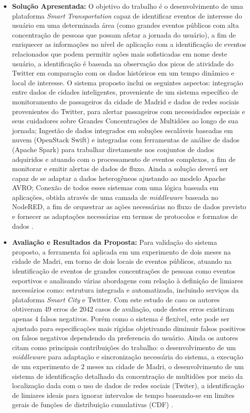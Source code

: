 \documentclass[tid,table]{texufpel} %
\begin{document}
\begin{itemize}
	\item \textbf{Solução Apresentada:} O objetivo do trabalho é o desenvolvimento de uma plataforma \textit{Smart Transportation} capaz de identificar eventos de interesse do usuário em uma determinada área (como grandes eventos públicos com alta concentração de pessoas que possam afetar a jornada do usuário), a fim de enriquecer as informações no nível de aplicação com a identificação de eventos relacionados que podem permitir ações mais sofisticadas em nome deste usuário, a identificação é baseada na observação dos picos de atividade do Twitter em comparação com os dados históricos em um tempo dinâmico e local de interesse. O sistema proposto inclui os seguintes aspectos: integração entre dados de cidades inteligentes, proveniente de um sistema específico de monitoramento de passageiros da cidade de Madrid e dados de redes sociais provenientes do Twitter, para alertar passageiros com necessidades especiais e seus cuidadores sobre Grandes Concentrações de Multidões ao longo de sua jornada; Ingestão de dados integrados em soluções escaláveis baseadas em nuvem (OpenStack Swift) e integradas com ferramentas de análise de dados (Apache Spark) para trabalhar diretamente nos conjuntos de dados adquiridos e atuando com o processamento de eventos complexos, a fim de monitorar e emitir alertas de dados de fluxo. Ainda a solução deverá ser capaz de se adaptar a dados heterogêneos ajustando ao modelo Apache AVRO; Conexão de todos esses sistemas com uma lógica baseada em aplicações, obtida através de uma camada de \textit{middleware} baseada no NodeRED, a fim de orquestrar as ações necessárias no fluxo de dados previsto e fornecer as adaptações necessárias em termos de protocolos e formatos de dados \cite{art9kousiouris2018integrated}.	
	
	\item \textbf{Avaliação e Resultados da Proposta:} Para validação do sistema proposto, a ferramenta foi aplicada em um experimento de dois meses na cidade de Madri, em torno de dois locais de eventos públicos, atuando na identificação de eventos de grandes concentrações de pessoas como eventos esportivos e analisando várias abordagens com relação à definição de limiares necessários como: estrutura integrada e automatizada, incluindo serviços da plataforma \textit{Smart City} e Twitter. Com este estudo de caso os autores obtiveram 49 erros de 2042 casos de avaliação, onde destes erros existiram apenas 4 falsos negativos. Porém como o sistema é flexível, este pode ser ajustado para especificações mais rígidas objetivando diminuir falsos positivos ou falsos negativos dependendo da preferencia do usuário.
	Ainda os autores citam como principais contribuições do trabalho: o desenvolvimento de um \textit{middleware} para adaptação e sincronização necessária do sistema, a execução de um experimento de 2 meses na cidade de Madri, o desenvolvimento de um sistema de identificação detalhado da concentração  de multidões por meio da localização dada com o uso de dados de redes sociais (Twiter), a identificação de limiares ideais para ignorar intervalos de tempo baseando-se em limites gerais de funções de distribuição cumulativas (CDF) \cite{art9kousiouris2018integrated}.
\end{itemize}
\end{document}
